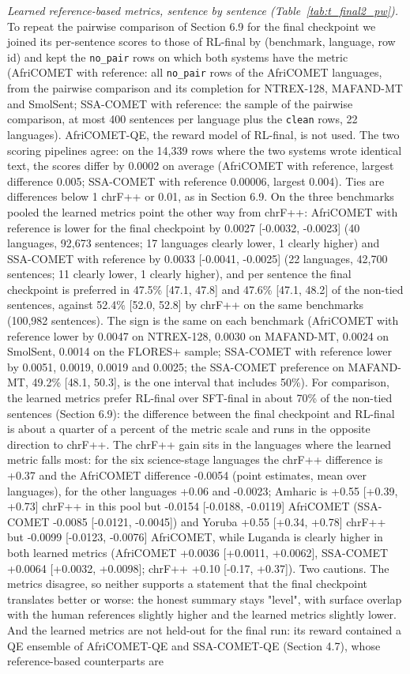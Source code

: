 \emph{Learned reference-based metrics, sentence by sentence (Table~\ref{tab:t_final2_pw}).} To repeat the pairwise comparison of Section 6.9 for the final checkpoint we joined its per-sentence scores to those of RL-final by (benchmark, language, row id) and kept the \texttt{no\_pair} rows on which both systems have the metric (AfriCOMET with reference: all \texttt{no\_pair} rows of the AfriCOMET languages, from the pairwise comparison and its completion for NTREX-128, MAFAND-MT and SmolSent; SSA-COMET with reference: the sample of the pairwise comparison, at most 400 sentences per language plus the \texttt{clean} rows, 22 languages). AfriCOMET-QE, the reward model of RL-final, is not used. The two scoring pipelines agree: on the 14,339 rows where the two systems wrote identical text, the scores differ by 0.0002 on average (AfriCOMET with reference, largest difference 0.005; SSA-COMET with reference 0.00006, largest 0.004). Ties are differences below 1 chrF++ or 0.01, as in Section 6.9. On the three benchmarks pooled the learned metrics point the other way from chrF++: AfriCOMET with reference is lower for the final checkpoint by 0.0027 {[}-0.0032, -0.0023{]} (40 languages, 92,673 sentences; 17 languages clearly lower, 1 clearly higher) and SSA-COMET with reference by 0.0033 {[}-0.0041, -0.0025{]} (22 languages, 42,700 sentences; 11 clearly lower, 1 clearly higher), and per sentence the final checkpoint is preferred in 47.5\% {[}47.1, 47.8{]} and 47.6\% {[}47.1, 48.2{]} of the non-tied sentences, against 52.4\% {[}52.0, 52.8{]} by chrF++ on the same benchmarks (100,982 sentences). The sign is the same on each benchmark (AfriCOMET with reference lower by 0.0047 on NTREX-128, 0.0030 on MAFAND-MT, 0.0024 on SmolSent, 0.0014 on the FLORES+ sample; SSA-COMET with reference lower by 0.0051, 0.0019, 0.0019 and 0.0025; the SSA-COMET preference on MAFAND-MT, 49.2\% {[}48.1, 50.3{]}, is the one interval that includes 50\%). For comparison, the learned metrics prefer RL-final over SFT-final in about 70\% of the non-tied sentences (Section 6.9): the difference between the final checkpoint and RL-final is about a quarter of a percent of the metric scale and runs in the opposite direction to chrF++. The chrF++ gain sits in the languages where the learned metric falls most: for the six science-stage languages the chrF++ difference is +0.37 and the AfriCOMET difference -0.0054 (point estimates, mean over languages), for the other languages +0.06 and -0.0023; Amharic is +0.55 {[}+0.39, +0.73{]} chrF++ in this pool but -0.0154 {[}-0.0188, -0.0119{]} AfriCOMET (SSA-COMET -0.0085 {[}-0.0121, -0.0045{]}) and Yoruba +0.55 {[}+0.34, +0.78{]} chrF++ but -0.0099 {[}-0.0123, -0.0076{]} AfriCOMET, while Luganda is clearly higher in both learned metrics (AfriCOMET +0.0036 {[}+0.0011, +0.0062{]}, SSA-COMET +0.0064 {[}+0.0032, +0.0098{]}; chrF++ +0.10 {[}-0.17, +0.37{]}). Two cautions. The metrics disagree, so neither supports a statement that the final checkpoint translates better or worse: the honest summary stays "level", with surface overlap with the human references slightly higher and the learned metrics slightly lower. And the learned metrics are not held-out for the final run: its reward contained a QE ensemble of AfriCOMET-QE and SSA-COMET-QE (Section 4.7), whose reference-based counterparts are 